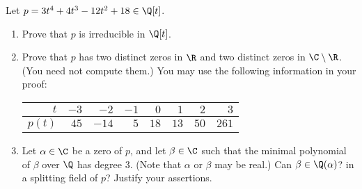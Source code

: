 %
%

\noindent{}Let $p = 3 t^{4} + 4 t^{3} - 12 t^{2} + 18 \in \Q[t]$.
\begin{enumerate}[label=(\alph*)]
\item\label{itm : LQ05Aa} Prove that $p$ is irreducible in $\Q[t]$.
\item\label{itm : LQ05Ab} Prove that $p$ has two distinct zeros in $\R$ and two distinct zeros in $\C \setminus \R$. (You need not compute them.) You may use the following information in your proof:
\begin{center}
\begin{tabular}{r|r r r r r r r}
\hline\hline
$t$			&	$-3$		&	$-2$	&	$-1$		&	$0$	&	$1$	&	$2$	&	$3$	\\
\hline
$p(t)$		&	$45$		&	$-14$	&	$5$	&	$18$	&	$13$	&	$50$	&	$261$	\\
\hline
\end{tabular}
\end{center}
\item\label{itm : LQ05Ac} Let $\alpha \in \C$ be a zero of $p$, and let $\beta \in \C$ such that the minimal polynomial of $\beta$ over $\Q$ has degree $3$. (Note that $\alpha$ or $\beta$ may be real.) Can $\beta \in \Q(\alpha)$? in a splitting field of $p$? Justify your assertions.
\end{enumerate}